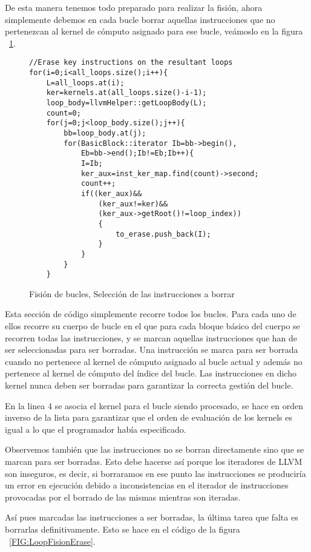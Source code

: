 De esta manera tenemos todo preparado para realizar la fisión, ahora simplemente debemos en cada bucle borrar aquellas instrucciones que no pertenezcan al kernel de cómputo asignado para ese bucle, veámoslo en la figura ~\ref{FIG:LoopFisionSelErase}.

\begin{figure}[t]
\begin{lstlisting}
//Erase key instructions on the resultant loops
for(i=0;i<all_loops.size();i++){
	L=all_loops.at(i);
	ker=kernels.at(all_loops.size()-i-1);
	loop_body=llvmHelper::getLoopBody(L);
	count=0;
	for(j=0;j<loop_body.size();j++){
		bb=loop_body.at(j);
		for(BasicBlock::iterator Ib=bb->begin(),
			Eb=bb->end();Ib!=Eb;Ib++){
			I=Ib;
			ker_aux=inst_ker_map.find(count)->second;
			count++;
			if((ker_aux)&&
				(ker_aux!=ker)&&
				(ker_aux->getRoot()!=loop_index))
				{
					to_erase.push_back(I);
				}
			}
		}
	}
\end{lstlisting}
\caption{Fisión de bucles, Selección de las instrucciones a borrar}
\label{FIG:LoopFisionSelErase}
\end{figure}

Esta sección de código simplemente recorre todos los bucles. Para cada uno de ellos recorre su cuerpo de bucle en el que para cada bloque básico del cuerpo se recorren todas las instrucciones, y se marcan aquellas instrucciones que han de ser seleccionadas para ser borradas.
Una instrucción se marca para ser borrada cuando no pertenece al kernel de cómputo asignado al bucle actual y además no pertenece al kernel de cómputo del índice del bucle. Las instrucciones en dicho kernel nunca deben ser borradas para garantizar la correcta gestión del bucle.

En la linea 4 se asocia el kernel para el bucle siendo procesado, se hace en orden inverso de la lista para garantizar que el orden de evaluación de los kernels es igual a lo que el programador había especificado.

Observemos también que las instrucciones no se borran directamente sino que se marcan para ser borradas. Esto debe hacerse así porque los iteradores de LLVM son inseguros, es decir, si borraramos en ese punto las instrucciones se produciría un error en ejecución debido a inconsistencias en el iterador de instrucciones provocadas por el borrado de las mismas mientras son iteradas.

Así pues marcadas las instrucciones a ser borradas, la última tarea que falta es borrarlas definitivamente. Esto se hace en el código de la figura ~\ref{FIG:LoopFisionErase}.


